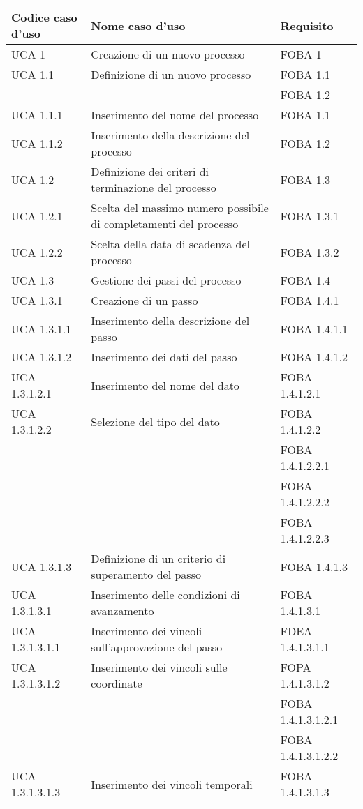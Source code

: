 \begin{longtable}{lXp{}}
\toprule
\textbf{Codice caso d'uso} & \textbf{Nome caso d'uso} & \textbf{Requisito}\\
\toprule
UCA 1&Creazione di un nuovo processo&FOBA 1\\
\midrule
UCA 1.1&Definizione di un nuovo processo&FOBA 1.1\\
&&FOBA 1.2\\
\midrule
UCA 1.1.1&Inserimento del nome del processo&FOBA 1.1\\
\midrule
UCA 1.1.2&Inserimento della descrizione del processo&FOBA 1.2\\
\midrule
UCA 1.2&Definizione dei criteri di terminazione del processo&FOBA 1.3\\
\midrule
UCA 1.2.1&Scelta del massimo numero possibile di completamenti del processo&FOBA 1.3.1\\
\midrule
UCA 1.2.2&Scelta della data di scadenza del processo&FOBA 1.3.2\\
\midrule
UCA 1.3&Gestione dei passi del processo&FOBA 1.4\\
\midrule
UCA 1.3.1&Creazione di un passo&FOBA 1.4.1\\
\midrule
UCA 1.3.1.1&Inserimento della descrizione del passo&FOBA 1.4.1.1\\
\midrule
UCA 1.3.1.2&Inserimento dei dati del passo&FOBA 1.4.1.2\\
\midrule
UCA 1.3.1.2.1&Inserimento del nome del dato&FOBA 1.4.1.2.1\\
\midrule
UCA 1.3.1.2.2&Selezione del tipo del dato&FOBA 1.4.1.2.2\\
&&FOBA 1.4.1.2.2.1\\
&&FOBA 1.4.1.2.2.2\\
&&FOBA 1.4.1.2.2.3\\
\midrule
UCA 1.3.1.3&Definizione di un criterio di superamento del passo&FOBA 1.4.1.3\\
\midrule
UCA 1.3.1.3.1&Inserimento delle condizioni di avanzamento&FOBA 1.4.1.3.1\\
\midrule
UCA 1.3.1.3.1.1&Inserimento dei vincoli sull'approvazione del passo&FDEA 1.4.1.3.1.1\\
\midrule
UCA 1.3.1.3.1.2&Inserimento dei vincoli sulle coordinate&FOPA 1.4.1.3.1.2\\
&&FOBA 1.4.1.3.1.2.1\\
&&FOBA 1.4.1.3.1.2.2\\
\midrule
UCA 1.3.1.3.1.3&Inserimento dei vincoli temporali&FOBA 1.4.1.3.1.3\\

\end{longtable}
